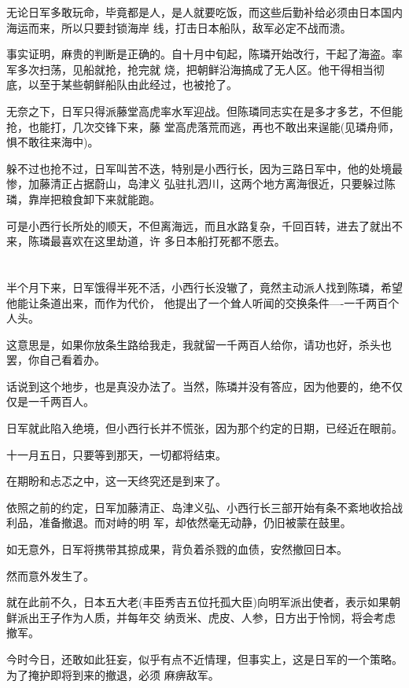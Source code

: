 \documentclass[11pt,a4paper,onecolumn]{article}
\begin{document}
无论日军多敢玩命，毕竟都是人，是人就要吃饭，而这些后勤补给必须由日本国内海运而来，所以只要封锁海岸
线，打击日本船队，敌军必定不战而溃。

事实证明，麻贵的判断是正确的。自十月中旬起，陈璘开始改行，干起了海盗。率军多次扫荡，见船就抢，抢完就
烧，把朝鲜沿海搞成了无人区。他干得相当彻底，以至于某些朝鲜船队由此经过，也被抢了。

无奈之下，日军只得派藤堂高虎率水军迎战。但陈璘同志实在是多才多艺，不但能抢，也能打，几次交锋下来，藤
堂高虎落荒而逃，再也不敢出来逞能(见璘舟师，惧不敢往来海中)。

躲不过也抢不过，日军叫苦不迭，特别是小西行长，因为三路日军中，他的处境最惨，加藤清正占据蔚山，岛津义
弘驻扎泗川，这两个地方离海很近，只要躲过陈璘，靠岸把粮食卸下来就能跑。

可是小西行长所处的顺天，不但离海远，而且水路复杂，千回百转，进去了就出不来，陈璘最喜欢在这里劫道，许
多日本船打死都不愿去。

\section[\thesection]{}

半个月下来，日军饿得半死不活，小西行长没辙了，竟然主动派人找到陈璘，希望他能让条道出来，而作为代价，
他提出了一个耸人听闻的交换条件----一千两百个人头。

这意思是，如果你放条生路给我走，我就留一千两百人给你，请功也好，杀头也罢，你自己看着办。

话说到这个地步，也是真没办法了。当然，陈璘并没有答应，因为他要的，绝不仅仅是一千两百人。

日军就此陷入绝境，但小西行长并不慌张，因为那个约定的日期，已经近在眼前。

十一月五日，只要等到那天，一切都将结束。

在期盼和忐忑之中，这一天终究还是到来了。

依照之前的约定，日军加藤清正、岛津义弘、小西行长三部开始有条不紊地收拾战利品，准备撤退。而对峙的明
军，却依然毫无动静，仍旧被蒙在鼓里。

如无意外，日军将携带其掠成果，背负着杀戮的血债，安然撤回日本。

然而意外发生了。

就在此前不久，日本五大老(丰臣秀吉五位托孤大臣)向明军派出使者，表示如果朝鲜派出王子作为人质，并每年交
纳贡米、虎皮、人参，日方出于怜悯，将会考虑撤军。

今时今日，还敢如此狂妄，似乎有点不近情理，但事实上，这是日军的一个策略。为了掩护即将到来的撤退，必须
麻痹敌军。
\end{document}
